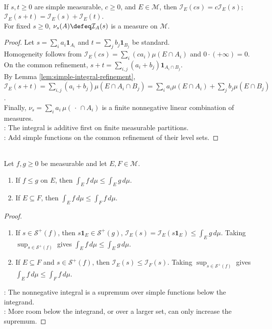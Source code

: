\begin{proposition} \label{prop:simple-integral-linearity-and-measure} \\
If $s,t\geq0$ are simple measurable, $c\geq0$, and $E\in\mathcal{M}$, then $\mathcal{I}_E(cs)=c\mathcal{I}_E(s)$; $\mathcal{I}_E(s+t)=\mathcal{I}_E(s)+\mathcal{I}_E(t)$.\\
For fixed $s\geq0$, $\nu_s(A)\defeq\mathcal{I}_A(s)$ is a measure on $\mathcal{M}$.
\begin{proof} Let $s=\sum_ia_i\mathbf{1}_{A_i}$ and $t=\sum_jb_j\mathbf{1}_{B_j}$ be standard.\\
Homogeneity follows from $\mathcal{I}_E(cs)=\sum_i(ca_i)\mu(E\cap A_i)$ and $0\cdot(+\infty)=0$.\\
On the common refinement, $s+t=\sum\limits_{i,j}(a_i+b_j)\mathbf{1}_{A_i\cap B_j}$.\\
By Lemma \ref{lem:simple-integral-refinement}, $\mathcal{I}_E(s+t) =\sum\limits_{i,j}(a_i+b_j)\mu(E\cap A_i\cap B_j) =\sum\limits_ia_i\mu(E\cap A_i)+\sum_jb_j\mu(E\cap B_j)$.\\
Finally, $\nu_s=\sum_ia_i\,\mu(\,\cdot\,\cap A_i)$ is a finite nonnegative linear combination of measures.\\
: The integral is additive first on finite measurable partitions.\\
: Add simple functions on the common refinement of their level sets.
\end{proof}
\end{proposition}

\begin{proposition} \label{prop:positive-integral-monotonicity} \\
Let $f,g\geq0$ be measurable and let $E,F\in\mathcal{M}$.
\begin{enumerate}[label=(\roman*)]
\setlength{\itemsep}{0pt}
\item If $f\leq g$ on $E$, then $\int_E f\,d\mu\leq\int_E g\,d\mu$.
\item If $E\subseteq F$, then $\int_E f\,d\mu\leq\int_F f\,d\mu$.
\end{enumerate}
\begin{proof}
\begin{enumerate}[label=(\roman*)]
\setlength{\itemsep}{0pt}
\item If $s\in\mathcal{S}^+(f)$, then $s\mathbf{1}_E\in\mathcal{S}^+(g)$, $\mathcal{I}_E(s)=\mathcal{I}_E(s\mathbf{1}_E)\leq\int_Eg\,d\mu$. Taking $\sup_{s\in\mathcal{S}^+(f)}$ gives $\int_Ef\,d\mu\leq\int_Eg\,d\mu$.
\item If $E\subseteq F$ and $s\in\mathcal{S}^+(f)$, then $\mathcal{I}_E(s)\leq\mathcal{I}_F(s)$. Taking $\sup_{s\in\mathcal{S}^+(f)}$ gives $\int_Ef\,d\mu\leq\int_Ff\,d\mu$.
\end{enumerate}
: The nonnegative integral is a supremum over simple functions below the integrand.\\
: More room below the integrand, or over a larger set, can only increase the supremum.
\end{proof}
\end{proposition}

